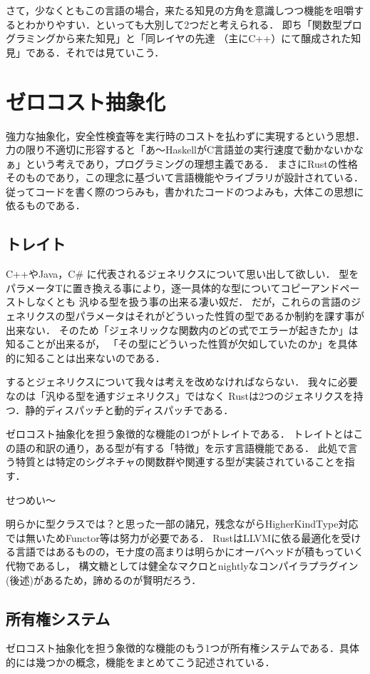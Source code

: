 さて，少なくともこの言語の場合，来たる知見の方角を意識しつつ機能を咀嚼するとわかりやすい．といっても大別して2つだと考えられる．
即ち「関数型プログラミングから来た知見」と「同レイヤの先達 （主にC++）にて醸成された知見」である．それでは見ていこう．

\section{ゼロコスト抽象化}
強力な抽象化，安全性検査等を実行時のコストを払わずに実現するという思想．
力の限り不適切に形容すると「あ〜HaskellがC言語並の実行速度で動かないかなぁ」という考えであり，プログラミングの理想主義である．
まさにRustの性格そのものであり，この理念に基づいて言語機能やライブラリが設計されている．
従ってコードを書く際のつらみも，書かれたコードのつよみも，大体この思想に依るものである．

\subsection{トレイト}
C++やJava，C\# に代表されるジェネリクスについて思い出して欲しい．
型をパラメータTに置き換える事により，逐一具体的な型についてコピーアンドペーストしなくとも
汎ゆる型を扱う事の出来る凄い奴だ．
だが，これらの言語のジェネリクスの型パラメータはそれがどういった性質の型であるか制約を課す事が出来ない．
そのため「ジェネリックな関数内のどの式でエラーが起きたか」は知ることが出来るが，
「その型にどういった性質が欠如していたのか」を具体的に知ることは出来ないのである．

するとジェネリクスについて我々は考えを改めなければならない．
我々に必要なのは「汎ゆる型を通すジェネリクス」ではなく
Rustは2つのジェネリクスを持つ．静的ディスパッチと動的ディスパッチである．

ゼロコスト抽象化を担う象徴的な機能の1つがトレイトである．
トレイトとはこの語の和訳の通り，ある型が有する「特徴」を示す言語機能である．
此処で言う特質とは特定のシグネチャの関数群や関連する型が実装されていることを指す．

せつめい〜

明らかに型クラスでは？と思った一部の諸兄，残念ながらHigherKindType対応では無いためFunctor等は努力が必要である．
RustはLLVMに依る最適化を受ける言語ではあるものの，モナ度の高まりは明らかにオーバヘッドが積もっていく代物であるし，
構文糖としては健全なマクロとnightlyなコンパイラプラグイン(後述)があるため，諦めるのが賢明だろう．

\subsection{所有権システム}
ゼロコスト抽象化を担う象徴的な機能のもう1つが所有権システムである．具体的には幾つかの概念，機能をまとめてこう記述されている．

